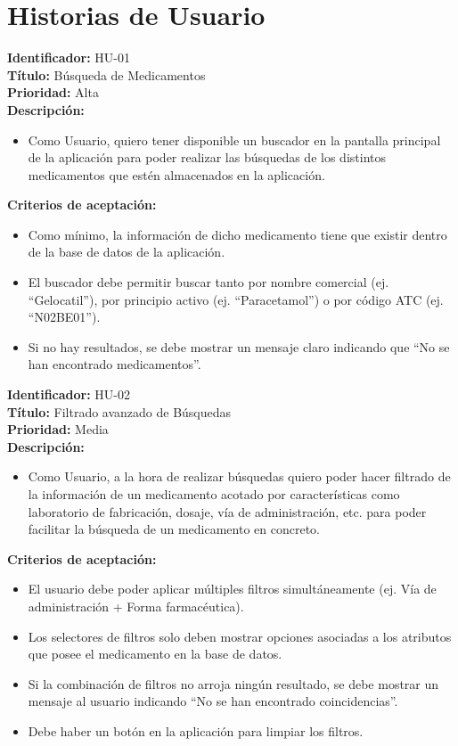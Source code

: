 \documentclass[12pt, a4paper]{report}
\begin{document}
\section{Historias de Usuario}
\noindent\textbf{Identificador:} HU-01 \\
\textbf{Título:} Búsqueda de Medicamentos \\
\textbf{Prioridad:} Alta \\
\textbf{Descripción:}
\begin{itemize}
    \item Como Usuario, quiero tener disponible un buscador en la pantalla principal de la aplicación para poder realizar las búsquedas de los distintos medicamentos que estén almacenados en la aplicación.
\end{itemize}
\textbf{Criterios de aceptación:}
\begin{itemize}
    \item Como mínimo, la información de dicho medicamento tiene que existir dentro de la base de datos de la aplicación.
    \item El buscador debe permitir buscar tanto por nombre comercial (ej. ``Gelocatil''), por principio activo (ej. ``Paracetamol'') o por código ATC (ej. ``N02BE01'').
    \item Si no hay resultados, se debe mostrar un mensaje claro indicando que ``No se han encontrado medicamentos''.
\end{itemize}

\vspace{0.5cm}
\noindent\textbf{Identificador:} HU-02 \\
\textbf{Título:} Filtrado avanzado de Búsquedas \\
\textbf{Prioridad:} Media \\
\textbf{Descripción:}
\begin{itemize}
    \item Como Usuario, a la hora de realizar búsquedas quiero poder hacer filtrado de la información de un medicamento acotado por características como laboratorio de fabricación, dosaje, vía de administración, etc. para poder facilitar la búsqueda de un medicamento en concreto.
\end{itemize}
\textbf{Criterios de aceptación:}
\begin{itemize}
    \item El usuario debe poder aplicar múltiples filtros simultáneamente (ej. Vía de administración + Forma farmacéutica).
    \item Los selectores de filtros solo deben mostrar opciones asociadas a los atributos que posee el medicamento en la base de datos.
    \item Si la combinación de filtros no arroja ningún resultado, se debe mostrar un mensaje al usuario indicando ``No se han encontrado coincidencias''.
    \item Debe haber un botón en la aplicación para limpiar los filtros.
\end{itemize}
\end{document}
